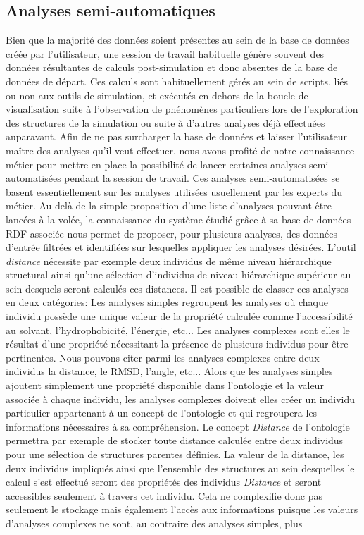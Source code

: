 \subsection{Analyses semi-automatiques}

Bien que la majorité des données soient présentes au sein de la base de données créée par l'utilisateur, une session de travail habituelle génère souvent des données résultantes de calculs post-simulation et donc absentes de la base de données de départ. Ces calculs sont habituellement gérés au sein de scripts, liés ou non aux outils de simulation, et exécutés en dehors de la boucle de visualisation suite à l'observation de phénomènes particuliers lors de l'exploration des structures de la simulation ou suite à d'autres analyses déjà effectuées auparavant. Afin de ne pas surcharger la base de données et laisser l'utilisateur maître des analyses qu'il veut effectuer, nous avons profité de notre connaissance métier pour mettre en place la possibilité de lancer certaines analyses semi-automatisées pendant la session de travail. Ces analyses semi-automatisées se basent essentiellement sur les analyses utilisées usuellement par les experts du métier. Au-delà de la simple proposition d'une liste d'analyses pouvant être lancées à la volée, la connaissance du système étudié grâce à sa base de données RDF associée nous permet de proposer, pour plusieurs analyses, des données d'entrée filtrées et identifiées sur lesquelles appliquer les analyses désirées. L'outil \textit{distance} nécessite par exemple deux individus de même niveau hiérarchique structural ainsi qu'une sélection d'individus de niveau hiérarchique supérieur au sein desquels seront calculés ces distances. Il est possible de classer ces analyses en deux catégories: Les analyses simples regroupent les analyses où chaque individu possède une unique valeur de la propriété calculée comme l'accessibilité au solvant, l'hydrophobicité, l'énergie, etc... Les analyses complexes sont elles le résultat d'une propriété nécessitant la présence de plusieurs individus pour être pertinentes. Nous pouvons citer parmi les analyses complexes entre deux individus la distance, le RMSD, l'angle, etc...
Alors que les analyses simples ajoutent simplement une propriété disponible dans l'ontologie et la valeur associée à chaque individu, les analyses complexes doivent elles créer un individu particulier appartenant à un concept de l'ontologie et qui regroupera les informations nécessaires à sa compréhension. Le concept \textit{Distance} de l'ontologie permettra par exemple de stocker toute distance calculée entre deux individus pour une sélection de structures parentes définies. La valeur de la distance, les deux individus impliqués ainsi que l'ensemble des structures au sein desquelles le calcul s'est effectué seront des propriétés des individus \textit{Distance} et seront accessibles seulement à travers cet individu. Cela ne complexifie donc pas seulement le stockage mais également l'accès aux informations puisque les valeurs d'analyses complexes ne sont, au contraire des analyses simples, plus
